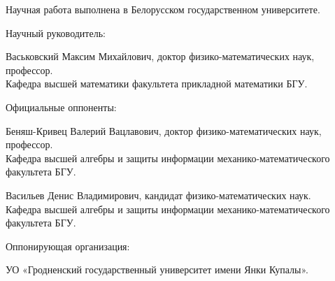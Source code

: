 \documentclass[_00_autoref.tex]{subfiles}
\begin{document}
\pagestyle{empty}
\setlength{\voffset}{-18mm}
\noindent Научная работа выполнена в Белорусском государственном университете.

\noindent
\begin{minipage}[t]{0.38\textwidth}
  \begin{flushleft}
    Научный руководитель:
  \end{flushleft}
\end{minipage}
\begin{minipage}[t]{0.61\textwidth}
  \begin{flushleft}
    Васьковский Максим Михайлович, доктор физико-математических наук, профессор.\\
    Кафедра высшей математики факультета прикладной математики БГУ.
  \end{flushleft}
\end{minipage}

\medskip
\noindent
\begin{minipage}[t]{0.38\textwidth}
    \begin{flushleft}
        Официальные оппоненты:
    \end{flushleft}
\end{minipage}
\begin{minipage}[t]{0.61\textwidth}
    \begin{flushleft}
        Беняш-Кривец Валерий Вацлавович, доктор физико-математических наук, профессор.\\
        Кафедра высшей алгебры и защиты информации механико-математического факультета БГУ.

        Васильев Денис Владимирович, кандидат физико-математических наук.\\
        Кафедра высшей алгебры и защиты информации механико-математического факультета БГУ.
\medskip
  \end{flushleft}
\end{minipage}

\medskip
\noindent
\begin{minipage}[t]{0.38\textwidth}
    \begin{flushleft}
        Оппонирующая организация:
    \end{flushleft}
\end{minipage}
\begin{minipage}[t]{0.61\textwidth}
    \begin{flushleft}
        УО «Гродненский государственный университет имени Янки Купалы».
    \medskip
  \end{flushleft}
\end{minipage}
\end{document}
